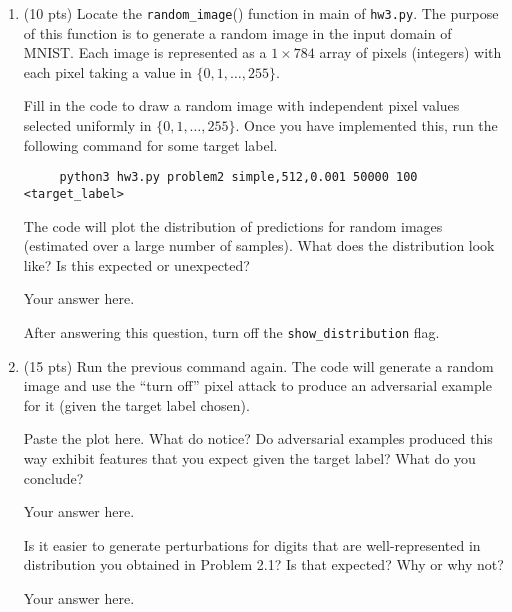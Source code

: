 %
\begin{enumerate}
%
	\item (10 pts) Locate the \texttt{random\_image}() function in main of \texttt{hw3.py}. The purpose of this function is to generate a random image in the input domain of MNIST. Each image is represented as a $1 \times 784$ array of pixels (integers) with each pixel taking a value in $\{0, 1, \ldots, 255\}$. 
	
	Fill in the code to draw a random image with independent pixel values selected uniformly in $\{0, 1, \ldots, 255\}$. Once you have implemented this, run the following command for some target label.
	
\begin{Verbatim}
     python3 hw3.py problem2 simple,512,0.001 50000 100 <target_label>
\end{Verbatim}

	\smallskip \noindent The code will plot the distribution of predictions for random images (estimated over a large number of samples). What does the distribution look like? Is this expected or unexpected?
	
	\begin{answer}
	
		Your answer here.
		
	\end{answer}
	
	After answering this question, turn off the \texttt{show\_distribution} flag.
	
	\item (15 pts) Run the previous command again. The code will generate a random image and use the ``turn off'' pixel attack to produce an adversarial example for it (given the target label chosen).
	
	Paste the plot here. What do notice? Do adversarial examples produced this way exhibit features that you expect given the target label? What do you conclude?
	
	\begin{answer}
	
		Your answer here.
		
	\end{answer}
	
	 \medskip \noindent Is it easier to generate perturbations for digits that are well-represented in distribution you obtained in Problem 2.1? Is that expected? Why or why not?
	
	\begin{answer}
	
		Your answer here.
		
	\end{answer}
	
%
\end{enumerate}



